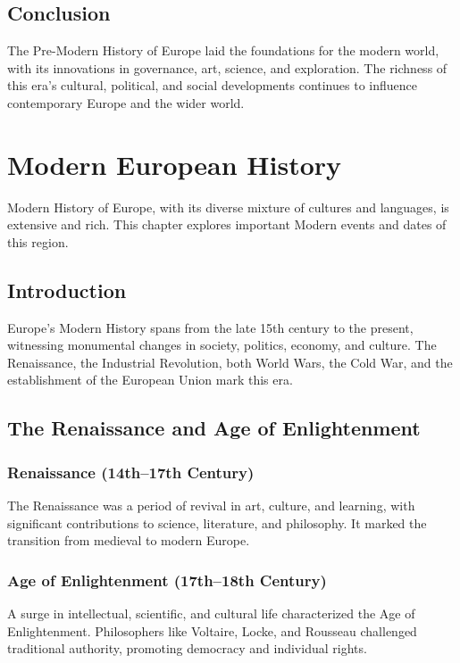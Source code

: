 \documentclass{book}
\begin{document}
\section{Conclusion}
\label{sec:conclusion-pre-modern-europe}
The Pre-Modern History of Europe laid the foundations for the modern world, with its innovations in governance, art, science, and exploration. The richness of this era’s cultural, political, and social developments continues to influence contemporary Europe and the wider world.

\chapter{Modern European History}
\label{ch:modern-european-history}

Modern History of Europe, with its diverse mixture of cultures and languages, is extensive and rich. This chapter explores important Modern events and dates of this region.

\section{Introduction}
\label{sec:introduction-modern-europe}
Europe's Modern History spans from the late 15th century to the present, witnessing monumental changes in society, politics, economy, and culture. The Renaissance, the Industrial Revolution, both World Wars, the Cold War, and the establishment of the European Union mark this era.

\section{The Renaissance and Age of Enlightenment}
\label{sec:renaissance-enlightenment}
\subsection{Renaissance (14th–17th Century)}
The Renaissance was a period of revival in art, culture, and learning, with significant contributions to science, literature, and philosophy. It marked the transition from medieval to modern Europe.

\subsection{Age of Enlightenment (17th–18th Century)}
A surge in intellectual, scientific, and cultural life characterized the Age of Enlightenment. Philosophers like Voltaire, Locke, and Rousseau challenged traditional authority, promoting democracy and individual rights.
\end{document}
